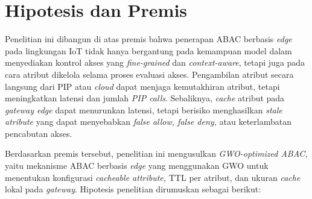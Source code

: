 \section{Hipotesis dan Premis}

Penelitian ini dibangun di atas premis bahwa penerapan ABAC berbasis \textit{edge} pada lingkungan IoT tidak hanya bergantung pada kemampuan model dalam menyediakan kontrol akses yang \textit{fine-grained} dan \textit{context-aware}, tetapi juga pada cara atribut dikelola selama proses evaluasi akses. Pengambilan atribut secara langsung dari PIP atau \textit{cloud} dapat menjaga kemutakhiran atribut, tetapi meningkatkan latensi dan jumlah \textit{PIP calls}. Sebaliknya, \textit{cache} atribut pada \textit{gateway edge} dapat menurunkan latensi, tetapi berisiko menghasilkan \textit{stale atribute} yang dapat menyebabkan \textit{false allow, false deny,} atau keterlambatan pencabutan akses.

Berdasarkan premis tersebut, penelitian ini mengusulkan \textit{GWO-optimized ABAC}, yaitu mekanisme ABAC berbasis \textit{edge} yang menggunakan GWO untuk menentukan konfigurasi \textit{cacheable attribute,} TTL per atribut, dan ukuran \textit{cache} lokal pada \textit{gateway}. Hipotesis penelitian dirumuskan sebagai berikut:

